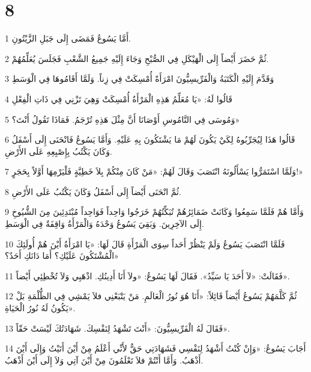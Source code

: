\chapter{8}

\par 1 أَمَّا يَسُوعُ فَمَضَى إِلَى جَبَلِ الزَّيْتُونِ.
\par 2 ثُمَّ حَضَرَ أَيْضاً إِلَى الْهَيْكَلِ فِي الصُّبْحِ وَجَاءَ إِلَيْهِ جَمِيعُ الشَّعْبِ فَجَلَسَ يُعَلِّمُهُمْ.
\par 3 وَقَدَّمَ إِلَيْهِ الْكَتَبَةُ وَالْفَرِّيسِيُّونَ امْرَأَةً أُمْسِكَتْ فِي زِناً. وَلَمَّا أَقَامُوهَا فِي الْوَسَطِ
\par 4 قَالُوا لَهُ: «يَا مُعَلِّمُ هَذِهِ الْمَرْأَةُ أُمْسِكَتْ وَهِيَ تَزْنِي فِي ذَاتِ الْفِعْلِ
\par 5 وَمُوسَى فِي النَّامُوسِ أَوْصَانَا أَنَّ مِثْلَ هَذِهِ تُرْجَمُ. فَمَاذَا تَقُولُ أَنْتَ؟»
\par 6 قَالُوا هَذَا لِيُجَرِّبُوهُ لِكَيْ يَكُونَ لَهُمْ مَا يَشْتَكُونَ بِهِ عَلَيْهِ. وَأَمَّا يَسُوعُ فَانْحَنَى إِلَى أَسْفَلُ وَكَانَ يَكْتُبُ بِإِصْبِعِهِ عَلَى الأَرْضِ.
\par 7 وَلَمَّا اسْتَمَرُّوا يَسْأَلُونَهُ انْتَصَبَ وَقَالَ لَهُمْ: «مَنْ كَانَ مِنْكُمْ بِلاَ خَطِيَّةٍ فَلْيَرْمِهَا أَوَّلاً بِحَجَرٍ!»
\par 8 ثُمَّ انْحَنَى أَيْضاً إِلَى أَسْفَلُ وَكَانَ يَكْتُبُ عَلَى الأَرْضِ.
\par 9 وَأَمَّا هُمْ فَلَمَّا سَمِعُوا وَكَانَتْ ضَمَائِرُهُمْ تُبَكِّتُهُمْ خَرَجُوا وَاحِداً فَوَاحِداً مُبْتَدِئِينَ مِنَ الشُّيُوخِ إِلَى الآخِرِينَ. وَبَقِيَ يَسُوعُ وَحْدَهُ وَالْمَرْأَةُ وَاقِفَةٌ فِي الْوَسَطِ.
\par 10 فَلَمَّا انْتَصَبَ يَسُوعُ وَلَمْ يَنْظُرْ أَحَداً سِوَى الْمَرْأَةِ قَالَ لَهَا: «يَا امْرَأَةُ أَيْنَ هُمْ أُولَئِكَ الْمُشْتَكُونَ عَلَيْكِ؟ أَمَا دَانَكِ أَحَدٌ؟»
\par 11 فَقَالَتْ: «لاَ أَحَدَ يَا سَيِّدُ». فَقَالَ لَهَا يَسُوعُ: «ولاَ أَنَا أَدِينُكِ. اذْهَبِي وَلاَ تُخْطِئِي أَيْضاً».
\par 12 ثُمَّ كَلَّمَهُمْ يَسُوعُ أَيْضاً قَائِلاً: «أَنَا هُوَ نُورُ الْعَالَمِ. مَنْ يَتْبَعْنِي فلاَ يَمْشِي فِي الظُّلْمَةِ بَلْ يَكُونُ لَهُ نُورُ الْحَيَاةِ».
\par 13 فَقَالَ لَهُ الْفَرِّيسِيُّونَ: «أَنْتَ تَشْهَدُ لِنَفْسِكَ. شَهَادَتُكَ لَيْسَتْ حَقّاً».
\par 14 أَجَابَ يَسُوعُ: «وَإِنْ كُنْتُ أَشْهَدُ لِنَفْسِي فَشَهَادَتِي حَقٌّ لأَنِّي أَعْلَمُ مِنْ أَيْنَ أَتَيْتُ وَإِلَى أَيْنَ أَذْهَبُ. وَأَمَّا أَنْتُمْ فلاَ تَعْلَمُونَ مِنْ أَيْنَ آتِي وَلاَ إِلَى أَيْنَ أَذْهَبُ.
